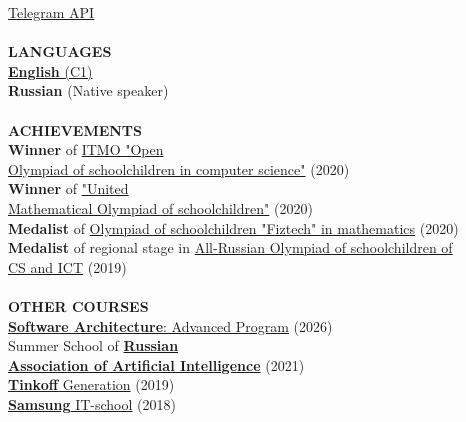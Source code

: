 \documentclass{article}
\begin{document}
\begin{vwcol}[widths={0.8,0.2},
 sep=.8cm, justify=flush,rule=0pt,indent=1em]
{\href{https://github.com/NikPeg/TukachBot}{Telegram API}\\
}
\\
\noindent\textcolor[rgb]{0.1255,0.2902,0.7843}{\textbf{LANGUAGES}}\\
\href{https://nikpeg.github.io/docs/IELTS.pdf}{\textbf{English} (C1)}\\
\textbf{Russian} (Native speaker)\\
\\
\noindent\textcolor[rgb]{0.1255,0.2902,0.7843}{\textbf{ACHIEVEMENTS}}\\
\textbf{Winner} of \href{https://olymp.itmo.ru/}{ITMO "Open\\ Olympiad of schoolchildren in computer science"} (2020)\\
\textbf{Winner} of \href{https://olympiads.mccme.ru/ommo/23/}{"United\\Mathematical Olympiad of schoolchildren"} (2020)\\
\textbf{Medalist} of \href{https://olymp.mipt.ru/}{Olympiad of schoolchildren "Fiztech" in mathematics} (2020)\\
\textbf{Medalist} of regional stage in \href{https://vos.olimpiada.ru/}{All-Russian Olympiad of schoolchildren of\\
 CS and ICT} (2019)\\
\\
\noindent\textcolor[rgb]{0.1255,0.2902,0.7843}{\textbf{OTHER COURSES}}\\
\href{https://nikpeg.github.io/docs/DiplomaYandex2026.pdf}{\textbf{Software Architecture}: Advanced Program} (2026)\\
Summer School of \href{https://raai.space/}{\textbf{Russian\\
Association of Artificial Intelligence}} (2021)\\
\href{https://fintech.tinkoff.ru/school/generation/}{\textbf{Tinkoff} Generation} (2019)\\
\href{https://myitschool.ru/}{\textbf{Samsung} IT-school} (2018)\\
\end{vwcol} 
\end{document}

